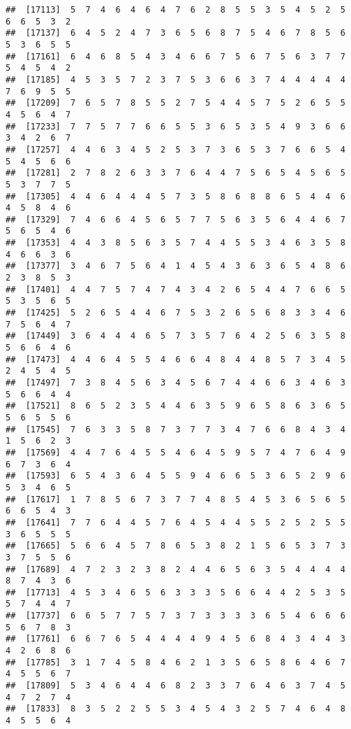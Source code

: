 \documentclass[
]{book}
\begin{document}
\begin{verbatim}
##  [17113]  5  7  4  6  4  6  4  7  6  2  8  5  5  3  5  4  5  2  5  6  6  5  3  2
##  [17137]  6  4  5  2  4  7  3  6  5  6  8  7  5  4  6  7  8  5  6  5  3  6  5  5
##  [17161]  6  4  6  8  5  4  3  4  6  6  7  5  6  7  5  6  3  7  7  5  4  5  4  2
##  [17185]  4  5  3  5  7  2  3  7  5  3  6  6  3  7  4  4  4  4  4  7  6  9  5  5
##  [17209]  7  6  5  7  8  5  5  2  7  5  4  4  5  7  5  2  6  5  5  4  5  6  4  7
##  [17233]  7  7  5  7  7  6  6  5  5  3  6  5  3  5  4  9  3  6  6  3  4  2  6  7
##  [17257]  4  4  6  3  4  5  2  5  3  7  3  6  5  3  7  6  6  5  4  5  4  5  6  6
##  [17281]  2  7  8  2  6  3  3  7  6  4  4  7  5  6  5  4  5  6  5  5  3  7  7  5
##  [17305]  4  4  6  4  4  4  5  7  3  5  8  6  8  8  6  5  4  4  6  4  5  8  4  6
##  [17329]  7  4  6  6  4  5  6  5  7  7  5  6  3  5  6  4  4  6  7  5  6  5  4  6
##  [17353]  4  4  3  8  5  6  3  5  7  4  4  5  5  3  4  6  3  5  8  4  6  6  3  6
##  [17377]  3  4  6  7  5  6  4  1  4  5  4  3  6  3  6  5  4  8  6  2  3  8  5  3
##  [17401]  4  4  7  5  7  4  7  4  3  4  2  6  5  4  4  7  6  6  5  5  3  5  6  5
##  [17425]  5  2  6  5  4  4  6  7  5  3  2  6  5  6  8  3  3  4  6  7  5  6  4  7
##  [17449]  3  6  4  4  4  6  5  7  3  5  7  6  4  2  5  6  3  5  8  5  6  6  4  6
##  [17473]  4  4  6  4  5  5  4  6  6  4  8  4  4  8  5  7  3  4  5  2  4  5  4  5
##  [17497]  7  3  8  4  5  6  3  4  5  6  7  4  4  6  6  3  4  6  3  5  6  6  4  4
##  [17521]  8  6  5  2  3  5  4  4  6  3  5  9  6  5  8  6  3  6  5  5  6  5  5  6
##  [17545]  7  6  3  3  5  8  7  3  7  7  3  4  7  6  6  8  4  3  4  1  5  6  2  3
##  [17569]  4  4  7  6  4  5  5  4  6  4  5  9  5  7  4  7  6  4  9  6  7  3  6  4
##  [17593]  6  5  4  3  6  4  5  5  9  4  6  6  5  3  6  5  2  9  6  5  3  4  6  5
##  [17617]  1  7  8  5  6  7  3  7  7  4  8  5  4  5  3  6  5  6  5  6  6  5  4  3
##  [17641]  7  7  6  4  4  5  7  6  4  5  4  4  5  5  2  5  2  5  5  3  6  5  5  5
##  [17665]  5  6  6  4  5  7  8  6  5  3  8  2  1  5  6  5  3  7  3  3  7  5  5  6
##  [17689]  4  7  2  3  2  3  8  2  4  4  6  5  6  3  5  4  4  4  4  8  7  4  3  6
##  [17713]  4  5  3  4  6  5  6  3  3  3  5  6  6  4  4  2  5  3  5  5  7  4  4  7
##  [17737]  6  6  5  7  7  5  7  3  7  3  3  3  3  6  5  4  6  6  6  5  6  7  8  3
##  [17761]  6  6  7  6  5  4  4  4  4  9  4  5  6  8  4  3  4  4  3  4  2  6  8  6
##  [17785]  3  1  7  4  5  8  4  6  2  1  3  5  6  5  8  6  4  6  7  4  5  5  6  7
##  [17809]  5  3  4  6  4  4  6  8  2  3  3  7  6  4  6  3  7  4  5  4  7  2  7  4
##  [17833]  8  3  5  2  2  5  5  3  4  5  4  3  2  5  7  4  6  4  8  4  5  5  6  4

\end{verbatim}
\end{document}
